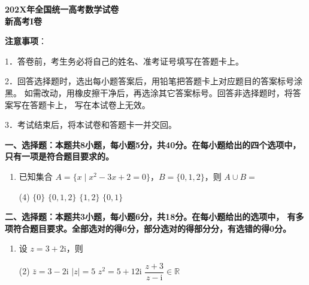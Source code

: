 \documentclass[12pt, a4paper, oneside]{ctexart}
\begin{document}
\begin{center}
    \LARGE{\textbf{202X年全国统一高考数学试卷\\新高考I卷}}
\end{center}

\vspace{0.5em}

\noindent\textbf{注意事项}：

1．答卷前，考生务必将自己的姓名、准考证号填写在答题卡上。

2．回答选择题时，选出每小题答案后，用铅笔把答题卡上对应题目的答案标号涂黑。
如需改动，用橡皮擦干净后，再选涂其它答案标号。回答非选择题时，将答案写在答题卡上，
写在本试卷上无效。

3．考试结束后，将本试卷和答题卡一并交回。

\vspace{1em}


\noindent\textbf{一、选择题：本题共8小题，每小题5分，共40分。在每小题给出的四个选项中，
只有一项是符合题目要求的。}

\begin{enumerate}[itemsep=0.3em]
    \item 已知集合 $A=\{x \mid x^2-3x+2=0\}$，$B=\{0,1,2\}$，则 $A \cup B =$
    \begin{tasks}(4)
        \task $\{0\}$
        \task $\{0,1,2\}$
        \task $\{1,2\}$
        \task $\{0,1\}$
    \end{tasks}
\end{enumerate}


\noindent\textbf{二、选择题：本题共3小题，每小题6分，共18分。在每小题给出的选项中，
有多项符合题目要求。全部选对的得6分，部分选对的得部分分，有选错的得0分。}

\begin{enumerate}[start=9, itemsep=0.5em]
    \item 设 $z = 3 + 2\mathrm{i}$，则
    \begin{tasks}(2)
        \task $\bar{z} = 3 - 2\mathrm{i}$
        \task $|z| = 5$
        \task $z^2 = 5 + 12\mathrm{i}$
        \task $\dfrac{z+3}{z-\mathrm{i}} \in \mathbb{R}$
    \end{tasks}
\end{enumerate}
\end{document}
